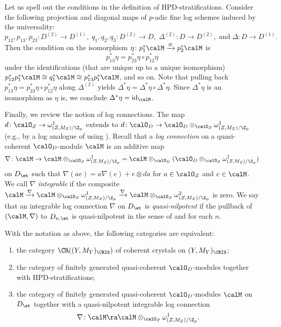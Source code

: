 \begin{rem}\label{rem:conditions on stratification}
Let us spell out the conditions in the definition of HPD-stratifications.
Consider the following projection and diagonal maps of $p$-adic fine log schemes induced by the universality:
\[
p_{12},p_{13}, p_{23}\colon D^{(2)} \rightarrow D^{(1)}, \;
q_1, q_2, q_3\colon D^{(2)}\rightarrow D, \;
\Delta^{(2)}\colon D\rightarrow D^{(2)}, \;\text{and}\;
\Delta\colon D\rightarrow D^{(1)}.
\]
Then the condition on the isomorphism $\eta\colon p_1^\ast \calM \xrightarrow{\cong}p_2^\ast \calM$ is 
\[
p_{13}^\ast\eta=p_{23}^\ast\eta \circ p_{12}^\ast\eta 
\]
under the identifications (that are unique up to a unique isomorphism) $p_{12}^\ast p_1^\ast \calM\cong q_1^\ast\calM \cong p_{13}^\ast p_1^\ast\calM$, and so on. Note that pulling back $p_{13}^\ast\eta=p_{23}^\ast\eta \circ p_{12}^\ast\eta$ along $\Delta^{(2)}$ yields
$\Delta^\ast\eta=\Delta^\ast\eta\circ \Delta^\ast\eta$. Since $\Delta^\ast\eta$ is an isomorphism as $\eta$ is, we conclude $\Delta^\ast\eta=\mathrm{id}_\calM$. 
\end{rem}


Finally, we review the notion of log connections. The map $d\colon \calO_Z\rightarrow \omega^1_{(Z,M_Z)/\Z_p}$ extends to $d\colon \calO_D\rightarrow \calO_D\otimes_{\calO_Z}\omega^1_{(Z,M_Z)/\Z_p}$ (e.g., by a log analogue of \cite[Cor.~6.3, Exer.~6.4]{berthelot-ogus-book} using \cite[Prop.~6.5]{Kato-log}). Recall that a \emph{log connection} on a quasi-coherent $\calO_D$-module $\calM$ is an additive map 
\[
\nabla\colon \calM\rightarrow\calM\otimes_{\calO_Z}\omega^1_{(Z,M_Z)/\Z_p}=\calM\otimes_{\calO_D}(\calO_D\otimes_{\calO_Z}\omega^1_{(Z,M_Z)/\Z_p})
\]
on $D_\et$ such that $\nabla(ae)=a\nabla(e)+e\otimes da$ for $a\in \calO_Z$ and $e\in \calM$. We call $\nabla$ \emph{integrable} if the composite $\calM\xrightarrow{\nabla}\calM\otimes_{\calO_Z}\omega^1_{(Z,M_Z)/\Z_p}\xrightarrow{\nabla}\calM\otimes_{\calO_Z}\omega^2_{(Z,M_Z)/\Z_p}$ is zero. We say that an integrable log connection $\nabla$ on $D_{\et}$ is \emph{quasi-nilpotent} if the pullback of $(\calM,\nabla)$  to $D_{n,\et}$ is quasi-nilpotent in the sense of \cite[Thm.~6.2(iii)]{Kato-log} and \cite[p.~19]{ogus-griffiths} for each $n$.


\begin{prop} \label{prop: crystals and quasi-nilpotent connections}
With the notation as above, the following categories are equivalent:
\begin{enumerate}
    \item the category $\CR((Y,M_Y)_\CRIS)$ of coherent crystals on $(Y,M_Y)_\CRIS$;
    \item the category of finitely generated quasi-coherent $\calO_D$-modules together with HPD-stratifications;
    \item the category of finitely generated quasi-coherent $\calO_D$-modules $\calM$ on $D_{\et}$ together with a quasi-nilpotent integrable log connection
    \[
    \nabla\colon \calM\ra \calM\otimes_{\calO_Z}\omega^1_{(Z,M_Z)/\Z_p}.
    \]
\end{enumerate}
\end{prop}

